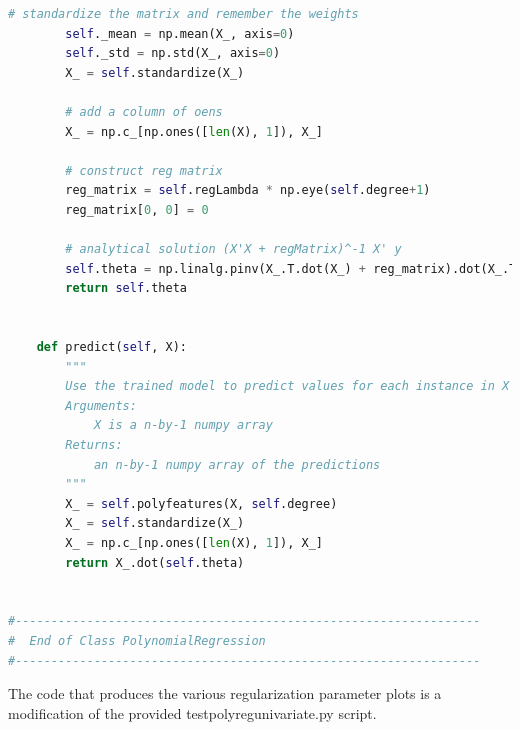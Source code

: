 \documentclass{article}
\newcommand{\1}{\mathbf{1}}
\begin{document}
\begin{lstlisting}[language=Python]
        # standardize the matrix and remember the weights
        self._mean = np.mean(X_, axis=0)
        self._std = np.std(X_, axis=0)
        X_ = self.standardize(X_)

        # add a column of oens
        X_ = np.c_[np.ones([len(X), 1]), X_]

        # construct reg matrix
        reg_matrix = self.regLambda * np.eye(self.degree+1)
        reg_matrix[0, 0] = 0

        # analytical solution (X'X + regMatrix)^-1 X' y
        self.theta = np.linalg.pinv(X_.T.dot(X_) + reg_matrix).dot(X_.T).dot(y)
        return self.theta


    def predict(self, X):
        """
        Use the trained model to predict values for each instance in X
        Arguments:
            X is a n-by-1 numpy array
        Returns:
            an n-by-1 numpy array of the predictions
        """
        X_ = self.polyfeatures(X, self.degree)
        X_ = self.standardize(X_)
        X_ = np.c_[np.ones([len(X), 1]), X_]        
        return X_.dot(self.theta)


#-----------------------------------------------------------------
#  End of Class PolynomialRegression
#-----------------------------------------------------------------
\end{lstlisting} 
The code that produces the various regularization parameter plots is a modification of the provided testpolyregunivariate.py script. 
\end{document}
